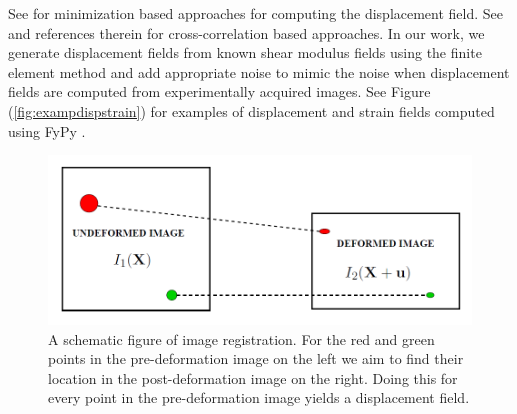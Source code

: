 \documentclass[12pt]{article}
\begin{document}
See \cite{paper:richards2009,paper:gokhale2004,paper:pellot-barakat2004} for minimization based approaches for computing the displacement field. See \cite{paper:ophir1991,paper:ophir1996,paper:alam1998} and references therein for cross-correlation based approaches. In our work, we generate displacement fields from known shear modulus fields using the finite element method \cite{book:hugheslinear,book:fishbelytschko} and add appropriate noise to mimic the noise when displacement fields are computed from experimentally acquired images. See Figure (\ref{fig:exampdispstrain}) for examples of displacement and strain fields computed using FyPy \cite{misc:fypy}.
%
\begin{figure}[h]
  \centering
  \includegraphics[totalheight=4cm]{Figures/regist.png}
  \caption{\label{fig:registschematic} A schematic figure of image registration. For the red and green points in the pre-deformation image on the left we aim to find their location in the post-deformation image on the right. Doing this for every point in the pre-deformation image yields a displacement field.}
\end{figure}
%
\end{document}
